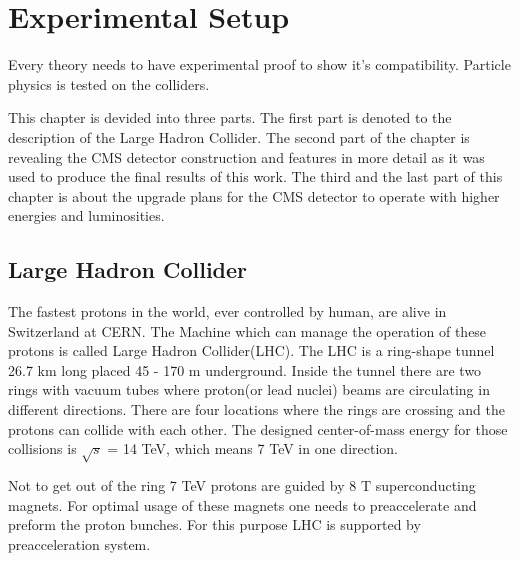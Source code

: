 \chapter{Experimental Setup}
Every theory needs to have experimental proof to show it's compatibility. Particle physics is tested on
the colliders.


This chapter is devided into three parts.
The first part is denoted to the description of the Large Hadron Collider. The second part of the 
chapter is revealing the CMS detector construction and features in more detail as it was used to produce the final
results of this work. The third and the last part of this chapter is about the upgrade plans for the
CMS detector to operate with higher energies and luminosities.

\section{Large Hadron Collider}\label{sec:LHC}

The fastest protons in the world, ever controlled by human, are alive in Switzerland at CERN.
The Machine which can manage the operation of these protons is called Large Hadron Collider(LHC). 
The LHC is a ring-shape tunnel 26.7 km long  placed 45 - 170 m underground. 
Inside the tunnel there are two rings with vacuum tubes where proton(or lead nuclei) beams are circulating in different directions.
There are four locations where the rings are crossing and the protons can collide with each other. 
The designed center-of-mass energy for those collisions is $\sqrt{s}$ = 14 TeV, which means 7 TeV in one direction.


Not to get out of the ring 7 TeV protons are guided by 8 T superconducting magnets. 
For optimal usage of these magnets one needs to preaccelerate and preform the proton bunches.
For this purpose LHC is supported by preacceleration system.


